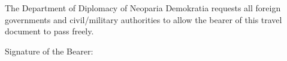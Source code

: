 \documentclass[a4paper,10pt]{article}
\begin{document}
    \vspace{4mm}

    \begin{minipage}[t][27mm][t]{174mm}
        \begin{tcolorbox}[height=25mm,width=84mm,nobeforeafter,colframe=blue,colback=white,boxrule=0.5pt]
            \raggedright
            The Department of Diplomacy of Neoparia Demokratia requests all foreign governments and civil/military authorities
                to allow the bearer of this travel document to pass freely.
        \end{tcolorbox}\hfill%
        \begin{tcolorbox}[height=25mm,width=84mm,nobeforeafter,colframe=blue,colback=white,boxrule=0.5pt]
            Signature of the Bearer:
        \end{tcolorbox}
        
    \end{minipage}
\end{document}
